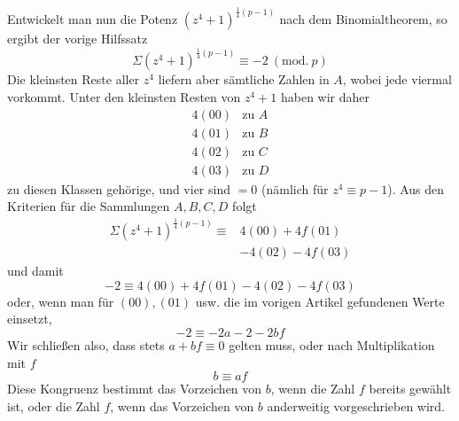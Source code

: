 %
Entwickelt man nun die Potenz $(z^4+1)^{\frac14(p-1)}$ nach dem Binomialtheorem, so ergibt der vorige Hilfssatz
\[
\Sigma(z^4+1)^{\frac14(p-1)}\equiv-2\ (\mathrm{mod.}\ p)
\]
Die kleinsten Reste aller $z^4$ liefern aber sämtliche Zahlen in $A$, wobei jede viermal vorkommt. Unter den kleinsten Resten von $z^4+1$ haben wir daher
\[
\begin{array}{rl}
4(00)&\text{zu }A\\
4(01)&\text{zu }B\\
4(02)&\text{zu }C\\
4(03)&\text{zu }D
\end{array}
\]
zu diesen Klassen gehörige, und vier sind $=0$ (nämlich für $z^4\equiv p-1$). Aus den Kriterien für die Sammlungen $A,B,C,D$ folgt
\[
\begin{aligned}
\Sigma(z^4+1)^{\frac14(p-1)}\equiv{}&4(00)+4f(01)\\
&-4(02)-4f(03)
\end{aligned}
\]
und damit
\[
-2\equiv4(00)+4f(01)-4(02)-4f(03)
\]
oder, wenn man für $(00),(01)$ usw. die im vorigen Artikel gefundenen Werte einsetzt,
\[
-2\equiv-2a-2-2bf
\]
Wir schließen also, dass stets $a+bf\equiv0$ gelten muss, oder nach Multiplikation mit $f$
\[
b\equiv af
\]
Diese Kongruenz bestimmt das Vorzeichen von $b$, wenn die Zahl $f$ bereits gewählt ist, oder die Zahl $f$, wenn das Vorzeichen von $b$ anderweitig vorgeschrieben wird.
